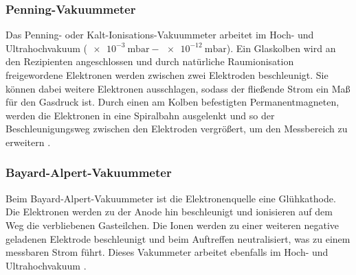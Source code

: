 \subsubsection{Penning-Vakuummeter}

Das Penning- oder Kalt-Ionisations-Vakuummeter arbeitet im Hoch- und Ultrahochvakuum ($\SI{e-3}{\milli\bar} - \SI{e-12}{\milli\bar}$). Ein Glaskolben wird an den Rezipienten angeschlossen und durch natürliche Raumionisation freigewordene Elektronen werden zwischen zwei Elektroden beschleunigt. Sie können dabei weitere Elektronen ausschlagen, sodass der fließende Strom ein Maß für den Gasdruck ist. Durch einen am Kolben befestigten Permanentmagneten, werden die Elektronen in eine Spiralbahn ausgelenkt und so der Beschleunigungsweg zwischen den Elektroden vergrößert, um den Messbereich zu erweitern \cite{Jena}.

\subsubsection{Bayard-Alpert-Vakuummeter}

Beim Bayard-Alpert-Vakuummeter ist die Elektronenquelle eine Glühkathode. Die Elektronen werden zu der Anode hin beschleunigt und ionisieren auf dem Weg die verbliebenen Gasteilchen. Die Ionen werden zu einer weiteren negative geladenen Elektrode beschleunigt und beim Auftreffen neutralisiert, was zu einem messbaren Strom führt. Dieses Vakummeter arbeitet ebenfalls im Hoch- und Ultrahochvakuum \cite{Spektrum}.

